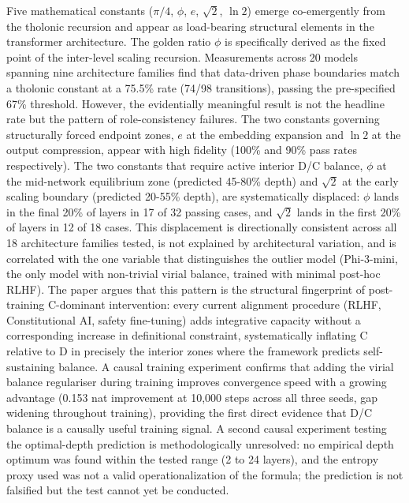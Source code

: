 \documentclass[
  11pt,
  letterpaper,
]{article}
\begin{document}
Five mathematical constants (\(\pi/4\), \(\phi\), \(e\), \(\sqrt{2}\),
\(\ln 2\)) emerge co-emergently from the tholonic recursion and appear
as load-bearing structural elements in the transformer architecture. The
golden ratio \(\phi\) is specifically derived as the fixed point of the
inter-level scaling recursion. Measurements across 20 models spanning
nine architecture families find that data-driven phase boundaries match
a tholonic constant at a 75.5\% rate (74/98 transitions), passing the
pre-specified 67\% threshold. However, the evidentially meaningful
result is not the headline rate but the pattern of role-consistency
failures. The two constants governing structurally forced endpoint
zones, \(e\) at the embedding expansion and \(\ln 2\) at the output
compression, appear with high fidelity (100\% and 90\% pass rates
respectively). The two constants that require active interior D/C
balance, \(\phi\) at the mid-network equilibrium zone (predicted 45-80\%
depth) and \(\sqrt{2}\) at the early scaling boundary (predicted 20-55\%
depth), are systematically displaced: \(\phi\) lands in the final 20\%
of layers in 17 of 32 passing cases, and \(\sqrt{2}\) lands in the first
20\% of layers in 12 of 18 cases. This displacement is directionally
consistent across all 18 architecture families tested, is not explained
by architectural variation, and is correlated with the one variable that
distinguishes the outlier model (Phi-3-mini, the only model with
non-trivial virial balance, trained with minimal post-hoc RLHF). The
paper argues that this pattern is the structural fingerprint of
post-training C-dominant intervention: every current alignment procedure
(RLHF, Constitutional AI, safety fine-tuning) adds integrative capacity
without a corresponding increase in definitional constraint,
systematically inflating C relative to D in precisely the interior zones
where the framework predicts self-sustaining balance. A causal training
experiment confirms that adding the virial balance regulariser during
training improves convergence speed with a growing advantage (0.153 nat
improvement at 10,000 steps across all three seeds, gap widening
throughout training), providing the first direct evidence that D/C
balance is a causally useful training signal. A second causal experiment
testing the optimal-depth prediction is methodologically unresolved: no
empirical depth optimum was found within the tested range (2 to 24
layers), and the entropy proxy used was not a valid operationalization
of the formula; the prediction is not falsified but the test cannot yet
be conducted.
\end{document}
